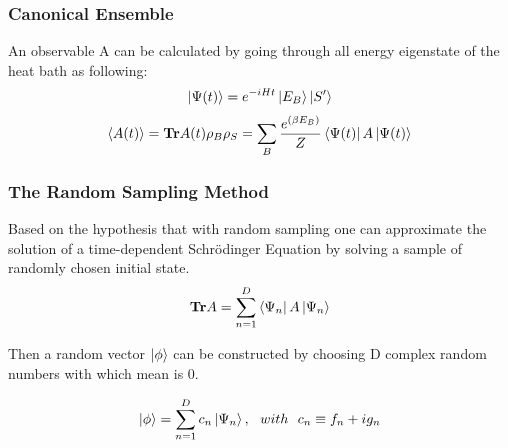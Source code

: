 \documentclass{beamer}
\begin{document}
\begin{frame}
	\frametitle{Canonical Ensemble}
	An observable A can be calculated by going through all energy eigenstate of the heat bath as following:\\
	
	\begin{equation*}
	\begin{split}
	\label{psi_assemble_method}
	\ket{\Psi(t)}&=e^{-iHt} \ket{E_B}\ket{S'}\\
	\end{split}
	\end{equation*}
	\begin{equation*}
	\langle A(t)\rangle = \mathbf{Tr} A(t) \rho_B \rho_S= \sum_{B}\frac{e^{(\beta E_B)}}{Z}\bra{\Psi(t)}A\ket{\Psi(t)}
	\end{equation*}
	
\end{frame}

\begin{frame}
	\frametitle{The Random Sampling Method}
	Based on the hypothesis that with random sampling one can approximate the solution of a time-dependent Schrödinger Equation by solving a sample of randomly chosen initial state.
	\begin{equation*}
	\begin{split}
	\mathbf{Tr}A=\sum_{n=1}^{D} \bra{\Psi_n}A\ket{\Psi_n}\\
	\end{split}
	\end{equation*}
	
	Then a random vector $\ket{\phi}$ can be constructed by choosing D complex random numbers with which mean is 0.
	
	\begin{equation*}
	\begin{split}
	\ket{\phi}= \sum_{n=1}^{D} c_n \ket{{\Psi_n}}, ~~ with ~~c_n \equiv f_n + i g_n\\
	\end{split}
	\end{equation*}
\end{frame}
\end{document}
